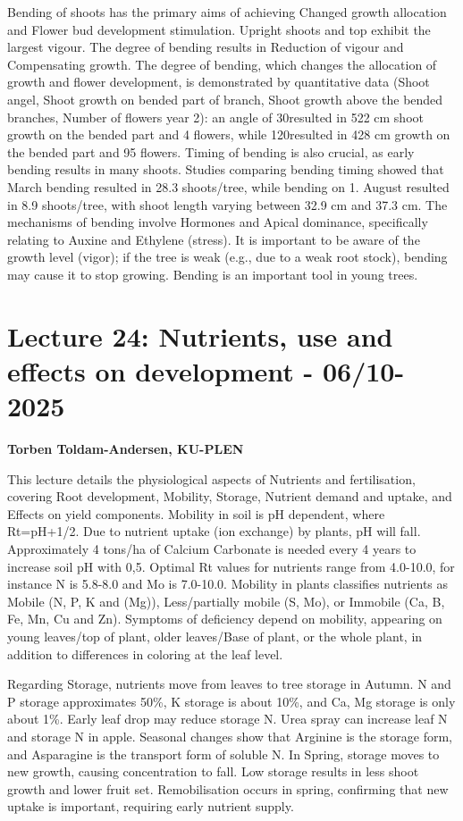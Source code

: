 \vspace{0.5em}
Bending of shoots has the primary aims of achieving Changed growth allocation and Flower bud development stimulation. Upright shoots and top exhibit the largest vigour. The degree of bending results in Reduction of vigour and Compensating growth. The degree of bending, which changes the allocation of growth and flower development, is demonstrated by quantitative data (Shoot angel, Shoot growth on bended part of branch, Shoot growth above the bended branches, Number of flowers year 2): an angle of 30\textdegree resulted in 522 cm shoot growth on the bended part and 4 flowers, while 120\textdegree resulted in 428 cm growth on the bended part and 95 flowers. Timing of bending is also crucial, as early bending results in many shoots. Studies comparing bending timing showed that March bending resulted in 28.3 shoots/tree, while bending on 1. August resulted in 8.9 shoots/tree, with shoot length varying between 32.9 cm and 37.3 cm. The mechanisms of bending involve Hormones and Apical dominance, specifically relating to Auxine and Ethylene (stress). It is important to be aware of the growth level (vigor); if the tree is weak (e.g., due to a weak root stock), bending may cause it to stop growing. Bending is an important tool in young trees.


\section{Lecture 24: Nutrients, use and effects on development - 06/10-2025}
\textbf{Torben Toldam-Andersen, KU-PLEN}

\vspace{1em}
This lecture details the physiological aspects of Nutrients and fertilisation, covering Root development, Mobility, Storage, Nutrient demand and uptake, and Effects on yield components. Mobility in soil is pH dependent, where Rt=pH+1/2. Due to nutrient uptake (ion exchange) by plants, pH will fall. Approximately 4 tons/ha of Calcium Carbonate is needed every 4 years to increase soil pH with 0,5. Optimal Rt values for nutrients range from 4.0-10.0, for instance N is 5.8-8.0 and Mo is 7.0-10.0. Mobility in plants classifies nutrients as Mobile (N, P, K and (Mg)), Less/partially mobile (S, Mo), or Immobile (Ca, B, Fe, Mn, Cu and Zn). Symptoms of deficiency depend on mobility, appearing on young leaves/top of plant, older leaves/Base of plant, or the whole plant, in addition to differences in coloring at the leaf level.

\vspace{0.5em}
Regarding Storage, nutrients move from leaves to tree storage in Autumn. N and P storage approximates 50\%, K storage is about 10\%, and Ca, Mg storage is only about 1\%. Early leaf drop may reduce storage N. Urea spray can increase leaf N and storage N in apple. Seasonal changes show that Arginine is the storage form, and Asparagine is the transport form of soluble N. In Spring, storage moves to new growth, causing concentration to fall. Low storage results in less shoot growth and lower fruit set. Remobilisation occurs in spring, confirming that new uptake is important, requiring early nutrient supply.

